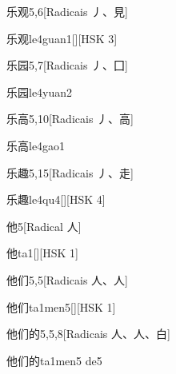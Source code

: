 \begin{entry}{乐观}{5,6}[Radicais ⼃、⾒]
  \begin{phonetics}{乐观}{le4guan1}[][HSK 3]
  \end{phonetics}
\end{entry}

\begin{entry}{乐园}{5,7}[Radicais ⼃、⼞]
  \begin{phonetics}{乐园}{le4yuan2}
  \end{phonetics}
\end{entry}

\begin{entry}{乐高}{5,10}[Radicais ⼃、⾼]
  \begin{phonetics}{乐高}{le4gao1}
  \end{phonetics}
\end{entry}

\begin{entry}{乐趣}{5,15}[Radicais ⼃、⾛]
  \begin{phonetics}{乐趣}{le4qu4}[][HSK 4]
  \end{phonetics}
\end{entry}

\begin{entry}{他}{5}[Radical ⼈]
  \begin{phonetics}{他}{ta1}[][HSK 1]
  \end{phonetics}
\end{entry}

\begin{entry}{他们}{5,5}[Radicais ⼈、⼈]
  \begin{phonetics}{他们}{ta1men5}[][HSK 1]
  \end{phonetics}
\end{entry}

\begin{entry}{他们的}{5,5,8}[Radicais ⼈、⼈、⽩]
  \begin{phonetics}{他们的}{ta1men5 de5}
  \end{phonetics}
\end{entry}

